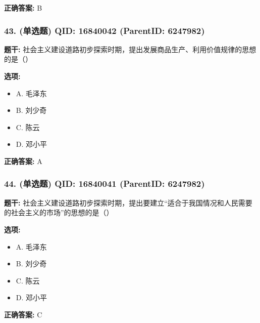 \documentclass[12pt,UTF8]{ctexart}
\begin{document}
\textbf{正确答案:}
B

\vspace{0.3em}\hrulefill\vspace{0.7em}

\subsubsection*{43. (单选题) \small QID: 16840042 (ParentID: 6247982)}

\textbf{题干:}
社会主义建设道路初步探索时期，提出发展商品生产、利用价值规律的思想的是（）



\textbf{选项:}
\begin{itemize}[leftmargin=*]

  \item A. 毛泽东

  \item B. 刘少奇

  \item C. 陈云

  \item D. 邓小平

\end{itemize}

\textbf{正确答案:}
A

\vspace{0.3em}\hrulefill\vspace{0.7em}

\subsubsection*{44. (单选题) \small QID: 16840041 (ParentID: 6247982)}

\textbf{题干:}
社会主义建设道路初步探索时期，提出要建立“适合于我国情况和人民需要的社会主义的市场”的思想的是（）



\textbf{选项:}
\begin{itemize}[leftmargin=*]

  \item A. 毛泽东

  \item B. 刘少奇

  \item C. 陈云

  \item D. 邓小平

\end{itemize}

\textbf{正确答案:}
C
\end{document}
